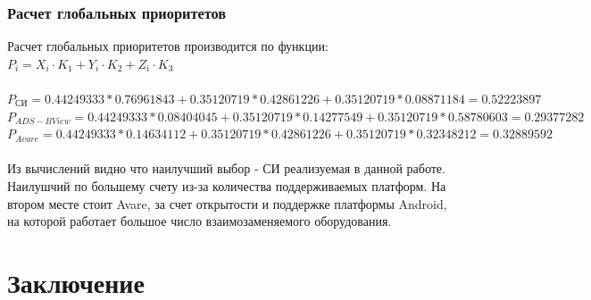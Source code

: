\documentclass[a4paper,12pt]{report} %
\begin{document}
\subsection{Расчет глобальных приоритетов}
Расчет глобальных приоритетов производится по функции: \\
$P_i=X_i \cdot K_1 + Y_i \cdot K_2 + Z_i \cdot K_3 $ \\
\\
$P_{СИ} = 0.44249333 * 0.76961843 + 0.35120719 * 0.42861226 + 0.35120719 *
0.08871184 = 0.52223897$ \\
$P_{ADS-B View} = 0.44249333 * 0.08404045 + 0.35120719 * 0.14277549 + 0.35120719
* 0.58780603 = 0.29377282 $ \\
$P_{Avare} = 0.44249333 * 0.14634112 + 0.35120719 * 0.42861226 + 0.35120719 *
0.32348212 = 0.32889592$ \\
\\
Из вычислений видно что наилучший выбор - СИ реализуемая в данной работе.
Наилушчий по большему счету из-за количества поддерживаемых платформ. На втором
месте стоит Avare, за счет открытости и поддержке платформы Android, на которой
работает большое число взаимозаменяемого оборудования.

\newpage
\chapter{Заключение}
\end{document}

